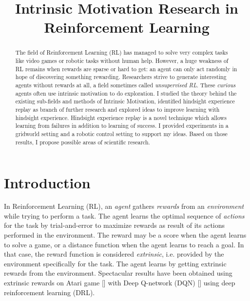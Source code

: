\documentclass[conference]{IEEEtran}
\begin{document}
\title{
    Intrinsic Motivation Research in Reinforcement Learning
}

\author{
}
\maketitle

\begin{abstract}
The field of Reinforcement Learning (RL) has managed to solve very complex tasks like video games or robotic tasks without human help. However, a huge weakness of RL remains when rewards are sparse or hard to get: an agent can only act randomly in hope of discovering something rewarding. Researchers strive to generate interesting agents without rewards at all, a field sometimes called \textit{unsupervised RL}. These \textit{curious} agents often use intrinsic motivation to do exploration. I studied the theory behind the existing sub-fields and methods of Intrinsic Motivation, identified hindsight experience replay as branch of further research and explored ideas to improve learning with hindsight experience. Hindsight experience replay is a novel technique which allows learning from failures in addition to learning of success. I provided experiments in a gridworld setting and a robotic control setting to support my ideas. Based on those results, I propose possible areas of scientific research.
\end{abstract}

\section{Introduction}

In Reinforcement Learning (RL), an \textit{agent} gathers \textit{rewards} from an \textit{environment} while trying to perform a task. The agent learns the optimal sequence of \textit{actions} for the task by trial-and-error to maximize rewards as result of its actions performed in the environment. The reward may be a score when the agent learns to solve a game, or a distance function when the agent learns to reach a goal. In that case, the reward function is considered \textit{extrinsic}, i.e. provided by the environment specifically for the task. The agent learns by getting extrinsic rewards from the environment. Spectacular results have been obtained using extrinsic rewards on Atari game [\cite{bellemare2013arcade}] with Deep Q-network (DQN) [\cite{mnih2015human}] using deep reinforcement learning (DRL).
\end{document}

